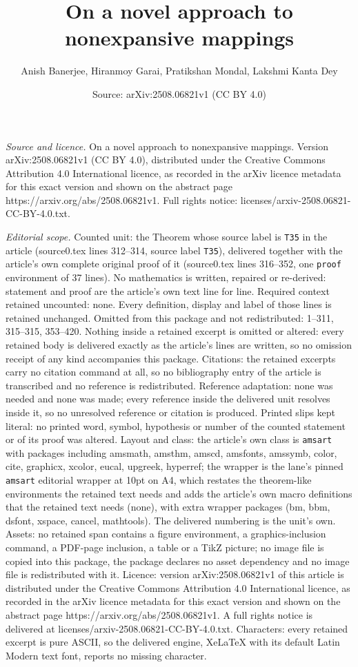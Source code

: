 \documentclass[10pt,a4paper]{amsart}
\title[On a novel approach to nonexpansive mappings]{On a novel approach to nonexpansive mappings}
\author{Anish Banerjee, Hiranmoy Garai, Pratikshan Mondal, Lakshmi Kanta Dey}
\date{Source: arXiv:2508.06821v1 (CC BY 4.0)}
\begin{document}
\maketitle

\noindent\emph{Source and licence.} On a novel approach to nonexpansive mappings. Version arXiv:2508.06821v1 (CC BY 4.0), distributed under the Creative Commons Attribution 4.0 International licence, as recorded in the arXiv licence metadata for this exact version and shown on the abstract page https://arxiv.org/abs/2508.06821v1. Full rights notice: licenses/arxiv-2508.06821-CC-BY-4.0.txt.\par\smallskip

\noindent\textit{Editorial scope.} Counted unit: the Theorem whose source label is \texttt{T35} in the article (source0.tex lines 312--314, source label \texttt{T35}), delivered together with the article's own complete original proof of it (source0.tex lines 316--352, one \texttt{proof} environment of 37 lines). No mathematics is written, repaired or re-derived: statement and proof are the article's own text line for line. Required context retained uncounted: none. Every definition, display and label of those lines is retained unchanged. Omitted from this package and not redistributed: 1--311, 315--315, 353--420. Nothing inside a retained excerpt is omitted or altered: every retained body is delivered exactly as the article's lines are written, so no omission receipt of any kind accompanies this package. Citations: the retained excerpts carry no citation command at all, so no bibliography entry of the article is transcribed and no reference is redistributed. Reference adaptation: none was needed and none was made; every reference inside the delivered unit resolves inside it, so no unresolved reference or citation is produced. Printed slips kept literal: no printed word, symbol, hypothesis or number of the counted statement or of its proof was altered. Layout and class: the article's own class is \texttt{amsart} with packages including amsmath, amsthm, amscd, amsfonts, amssymb, color, cite, graphicx, xcolor, eucal, upgreek, hyperref; the wrapper is the lane's pinned \texttt{amsart} editorial wrapper at 10pt on A4, which restates the theorem-like environments the retained text needs and adds the article's own macro definitions that the retained text needs (none), with extra wrapper packages (bm, bbm, dsfont, xspace, cancel, mathtools). The delivered numbering is the unit's own. Assets: no retained span contains a figure environment, a graphics-inclusion command, a PDF-page inclusion, a table or a TikZ picture; no image file is copied into this package, the package declares no asset dependency and no image file is redistributed with it. Licence: version arXiv:2508.06821v1 of this article is distributed under the Creative Commons Attribution 4.0 International licence, as recorded in the arXiv licence metadata for this exact version and shown on the abstract page https://arxiv.org/abs/2508.06821v1. A full rights notice is delivered at licenses/arxiv-2508.06821-CC-BY-4.0.txt. Characters: every retained excerpt is pure ASCII, so the delivered engine, XeLaTeX with its default Latin Modern text font, reports no missing character.
\end{document}
